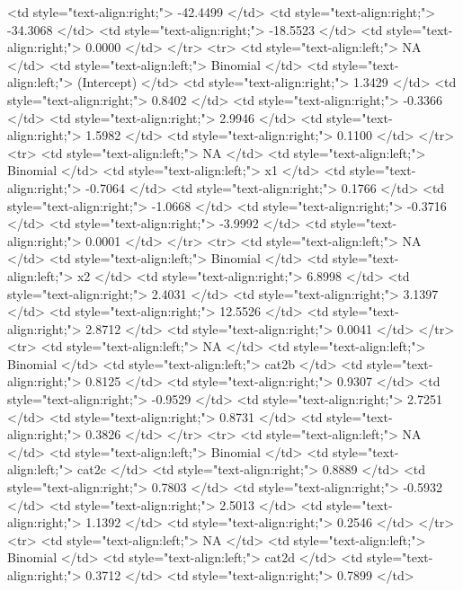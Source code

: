 \documentclass[a4paper]{article}
\begin{document}
\begin{HTML}
   <td style="text-align:right;"> -42.4499 </td>
   <td style="text-align:right;"> -34.3068 </td>
   <td style="text-align:right;"> -18.5523 </td>
   <td style="text-align:right;"> 0.0000 </td>
  </tr>
  <tr>
   <td style="text-align:left;"> NA </td>
   <td style="text-align:left;"> Binomial </td>
   <td style="text-align:left;"> (Intercept) </td>
   <td style="text-align:right;"> 1.3429 </td>
   <td style="text-align:right;"> 0.8402 </td>
   <td style="text-align:right;"> -0.3366 </td>
   <td style="text-align:right;"> 2.9946 </td>
   <td style="text-align:right;"> 1.5982 </td>
   <td style="text-align:right;"> 0.1100 </td>
  </tr>
  <tr>
   <td style="text-align:left;"> NA </td>
   <td style="text-align:left;"> Binomial </td>
   <td style="text-align:left;"> x1 </td>
   <td style="text-align:right;"> -0.7064 </td>
   <td style="text-align:right;"> 0.1766 </td>
   <td style="text-align:right;"> -1.0668 </td>
   <td style="text-align:right;"> -0.3716 </td>
   <td style="text-align:right;"> -3.9992 </td>
   <td style="text-align:right;"> 0.0001 </td>
  </tr>
  <tr>
   <td style="text-align:left;"> NA </td>
   <td style="text-align:left;"> Binomial </td>
   <td style="text-align:left;"> x2 </td>
   <td style="text-align:right;"> 6.8998 </td>
   <td style="text-align:right;"> 2.4031 </td>
   <td style="text-align:right;"> 3.1397 </td>
   <td style="text-align:right;"> 12.5526 </td>
   <td style="text-align:right;"> 2.8712 </td>
   <td style="text-align:right;"> 0.0041 </td>
  </tr>
  <tr>
   <td style="text-align:left;"> NA </td>
   <td style="text-align:left;"> Binomial </td>
   <td style="text-align:left;"> cat2b </td>
   <td style="text-align:right;"> 0.8125 </td>
   <td style="text-align:right;"> 0.9307 </td>
   <td style="text-align:right;"> -0.9529 </td>
   <td style="text-align:right;"> 2.7251 </td>
   <td style="text-align:right;"> 0.8731 </td>
   <td style="text-align:right;"> 0.3826 </td>
  </tr>
  <tr>
   <td style="text-align:left;"> NA </td>
   <td style="text-align:left;"> Binomial </td>
   <td style="text-align:left;"> cat2c </td>
   <td style="text-align:right;"> 0.8889 </td>
   <td style="text-align:right;"> 0.7803 </td>
   <td style="text-align:right;"> -0.5932 </td>
   <td style="text-align:right;"> 2.5013 </td>
   <td style="text-align:right;"> 1.1392 </td>
   <td style="text-align:right;"> 0.2546 </td>
  </tr>
  <tr>
   <td style="text-align:left;"> NA </td>
   <td style="text-align:left;"> Binomial </td>
   <td style="text-align:left;"> cat2d </td>
   <td style="text-align:right;"> 0.3712 </td>
   <td style="text-align:right;"> 0.7899 </td>

\end{HTML}
\end{document}
